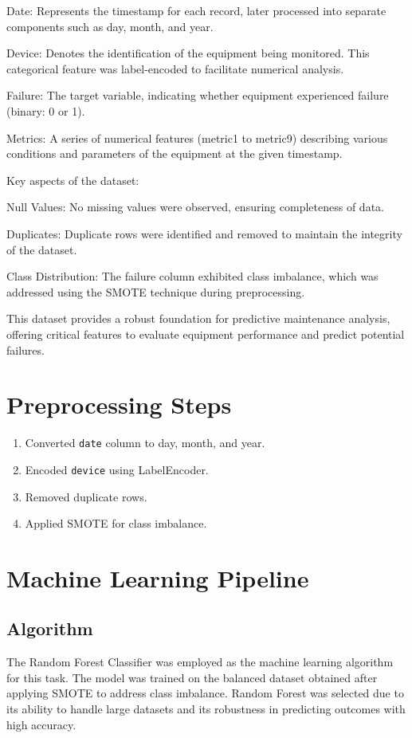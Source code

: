 \documentclass[a4paper,12pt]{article}
\begin{document}
	Date: Represents the timestamp for each record, later processed into separate components such as day, month, and year.
	
	Device: Denotes the identification of the equipment being monitored. This categorical feature was label-encoded to facilitate numerical analysis.
	
	Failure: The target variable, indicating whether equipment experienced failure (binary: 0 or 1).
	
	Metrics: A series of numerical features (metric1 to metric9) describing various conditions and parameters of the equipment at the given timestamp.
	
	Key aspects of the dataset:
	
	Null Values: No missing values were observed, ensuring completeness of data.
	
	Duplicates: Duplicate rows were identified and removed to maintain the integrity of the dataset.
	
	Class Distribution: The failure column exhibited class imbalance, which was addressed using the SMOTE technique during preprocessing.
	
	This dataset provides a robust foundation for predictive maintenance analysis, offering critical features to evaluate equipment performance and predict potential failures.
	
	\section{Preprocessing Steps}
	\begin{enumerate}
		\item Converted \texttt{date} column to day, month, and year.
		\item Encoded \texttt{device} using LabelEncoder.
		\item Removed duplicate rows.
		\item Applied SMOTE for class imbalance.
	\end{enumerate}
	
	\section{Machine Learning Pipeline}
	\subsection{Algorithm}
	The Random Forest Classifier was employed as the machine learning algorithm for this task. The model was trained on the balanced dataset obtained after applying SMOTE to address class imbalance. Random Forest was selected due to its ability to handle large datasets and its robustness in predicting outcomes with high accuracy.
	
\end{document}
